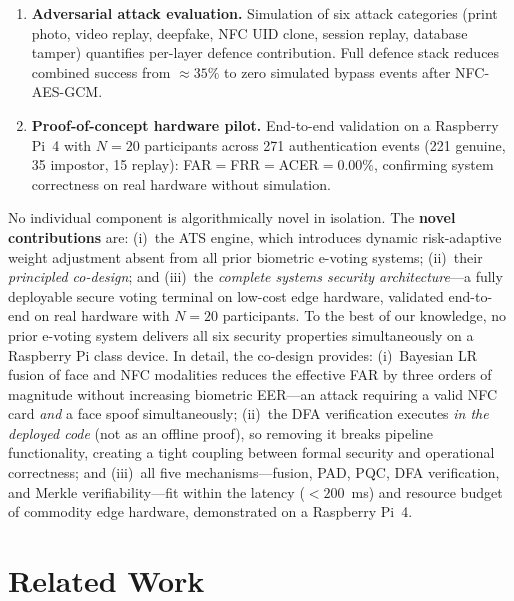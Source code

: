 \documentclass[pdflatex,sn-vancouver-num]{sn-jnl}%
\theoremstyle{thmstyleone}%
\theoremstyle{thmstyletwo}%
\theoremstyle{thmstylethree}%
\begin{document}
\begin{enumerate}[label=\textbf{C\arabic*.},leftmargin=*]
        simulated impostor attempts are rejected. To the best of our
        knowledge, no prior e-voting system incorporates dynamic
        risk-adaptive trust scoring.
  \item \textbf{Adversarial attack evaluation.} Simulation of six attack
        categories (print photo, video replay, deepfake, NFC UID clone,
        session replay, database tamper) quantifies per-layer defence
        contribution. Full defence stack reduces combined success from
        \(\approx35\%\) to zero simulated bypass events after NFC-AES-GCM.
  \item \textbf{Proof-of-concept hardware pilot.} End-to-end validation on
        a Raspberry Pi~4 with \(N{=}20\) participants across 271
        authentication events (221 genuine, 35 impostor, 15 replay):
        FAR\(=\)FRR\(=\)ACER\(=0.00\%\), confirming system correctness on
        real hardware without simulation.
\end{enumerate}

No individual component is algorithmically novel in isolation. The
\textbf{novel contributions} are: (i)~the ATS engine, which introduces
dynamic risk-adaptive weight adjustment absent from all prior biometric
e-voting systems; (ii)~their \emph{principled co-design}; and (iii)~the
\emph{complete systems security architecture}---a fully deployable secure
voting terminal on low-cost edge hardware, validated end-to-end on real
hardware with \(N{=}20\) participants. To the best of our knowledge, no
prior e-voting system delivers all six security properties simultaneously on
a Raspberry Pi class device. In detail, the co-design provides: (i)~Bayesian
LR fusion of face and NFC modalities reduces the effective FAR by three
orders of magnitude without increasing biometric EER---an attack requiring a
valid NFC card \emph{and} a face spoof simultaneously; (ii)~the DFA
verification executes \emph{in the deployed code} (not as an offline proof),
so removing it breaks pipeline functionality, creating a tight coupling
between formal security and operational correctness; and (iii)~all five
mechanisms---fusion, PAD, PQC, DFA verification, and Merkle
verifiability---fit within the latency (\(<200\)~ms) and resource budget of
commodity edge hardware, demonstrated on a Raspberry Pi~4.

\section{Related Work}\label{sec:related}
\end{document}
